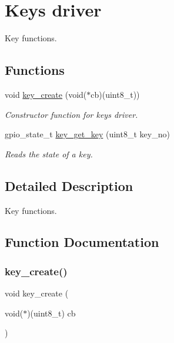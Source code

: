 \hypertarget{group__keys}{}\section{Keys driver}
\label{group__keys}


Key functions.  


\subsection*{Functions}
\begin{DoxyCompactItemize}
\item 
void \mbox{\hyperlink{group__keys_ga0b95c960c96ebb5f5b0560c673d6fa61}{key\+\_\+create}} (void($\ast$cb)(uint8\+\_\+t))
\begin{DoxyCompactList}\small\item\em Constructor function for keys driver. \end{DoxyCompactList}\item 
gpio\+\_\+state\+\_\+t \mbox{\hyperlink{group__keys_ga0494c33f8f3e276417da0a24771af467}{key\+\_\+get\+\_\+key}} (uint8\+\_\+t key\+\_\+no)
\begin{DoxyCompactList}\small\item\em Reads the state of a key. \end{DoxyCompactList}\end{DoxyCompactItemize}


\subsection{Detailed Description}
Key functions. 



\subsection{Function Documentation}
\mbox{\label{group__keys_ga0b95c960c96ebb5f5b0560c673d6fa61}} 
\subsubsection{\texorpdfstring{key\+\_\+create()}{key\_create()}}
{\footnotesize\ttfamily void key\+\_\+create (\begin{DoxyParamCaption}\item[{void($\ast$)(uint8\+\_\+t)}]{cb }\end{DoxyParamCaption})}



